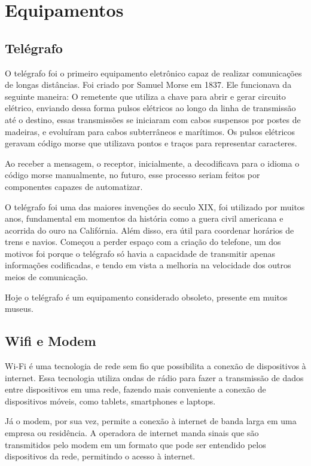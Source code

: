 \documentclass[12pt,a4, oneside, brazil]{article}
\begin{document}
\section{Equipamentos}
	\subsection{Telégrafo}
O telégrafo foi o primeiro equipamento eletrônico capaz de realizar comunicações de longas distâncias. Foi criado por Samuel Morse em 1837. Ele funcionava da seguinte maneira: O remetente que utiliza a chave para abrir e gerar circuito elétrico, enviando dessa forma pulsos elétricos ao longo da linha de transmissão até o destino, essas transmissões se iniciaram com cabos suspensos por postes de madeiras, e evoluíram para cabos subterrâneos e marítimos. Os pulsos elétricos geravam código morse que utilizava pontos e traços para representar caracteres.

Ao receber a mensagem, o receptor, inicialmente, a decodificava para o idioma o código morse manualmente, no futuro, esse processo seriam feitos por componentes capazes de automatizar. 

O telégrafo foi uma das maiores invenções do seculo XIX, foi utilizado por muitos anos, fundamental em momentos da história como a guera civil americana e acorrida do ouro na Califórnia. Além disso, era útil para coordenar horários de trens e navios. Começou a perder espaço com a criação do telefone, um dos motivos foi porque o telégrafo só havia a capacidade de transmitir apenas informações codificadas, e tendo em vista a melhoria na velocidade dos outros meios de comunicação.

Hoje o telégrafo é um equipamento considerado obsoleto, presente em muitos museus.

\subsection{Wifi e Modem}
Wi-Fi é uma tecnologia de rede sem fio que possibilita a conexão de dispositivos à internet. Essa tecnologia utiliza ondas de rádio para fazer a transmissão de dados entre dispositivos em uma rede, fazendo mais conveniente a conexão de dispositivos móveis, como tablets, smartphones e laptops.

Já o modem, por sua vez, permite a conexão à internet de banda larga em uma empresa ou residência. A operadora de internet manda sinais que são transmitidos pelo modem em um formato que pode ser entendido pelos dispositivos da rede, permitindo o acesso à internet.
\end{document}
